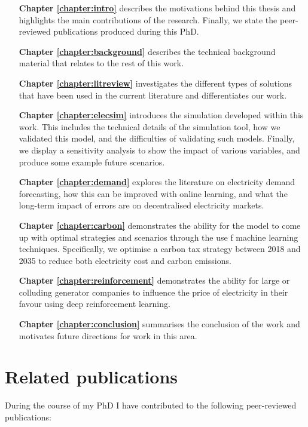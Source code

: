 \begin{itemize}[itemindent=3em]
	\item[\textbf{Chapter \ref{chapter:intro}}] describes the motivations behind this thesis and highlights the main contributions of the research. Finally, we state the peer-reviewed publications produced during this PhD. 
	\item[\textbf{Chapter \ref{chapter:background}}] describes the technical background material that relates to the rest of this work.
	\item[\textbf{Chapter \ref{chapter:litreview}}] investigates the different types of solutions that have been used in the current literature and differentiates our work. 
	\item[\textbf{Chapter \ref{chapter:elecsim}}] introduces the simulation developed within this work. This includes the technical details of the simulation tool, how we validated this model, and the difficulties of validating such models. Finally, we display a sensitivity analysis to show the impact of various variables, and produce some example future scenarios.
	\item[\textbf{Chapter \ref{chapter:demand}}] explores the literature on electricity demand forecasting, how this can be improved with online learning, and what the long-term impact of errors are on decentralised electricity markets.
	\item[\textbf{Chapter \ref{chapter:carbon}}] demonstrates the ability for the model to come up with optimal strategies and scenarios through the use f machine learning techniques. Specifically, we optimise a carbon tax strategy between 2018 and 2035 to reduce both electricity cost and carbon emissions.
	\item[\textbf{Chapter \ref{chapter:reinforcement}}] demonstrates the ability for large or colluding generator companies to influence the price of electricity in their favour using deep reinforcement learning.
	\item[\textbf{Chapter \ref{chapter:conclusion}}] summarises the conclusion of the work and motivates future directions for work in this area.
\end{itemize}




\section{Related publications}

During the course of my PhD I have contributed to the following peer-reviewed publications:	

